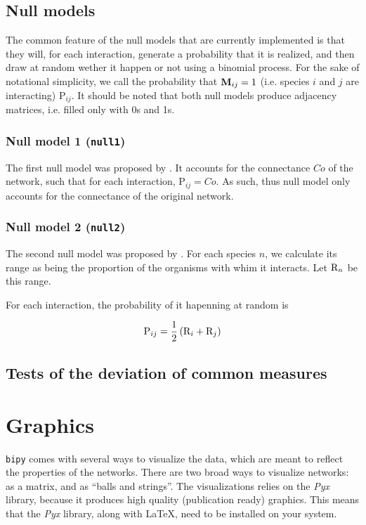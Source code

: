 \documentclass[10pt]{scrbook}
\begin{document}
\section{Null models}

The common feature of the null models that are currently implemented is that they will, for each interaction, generate a probability that it is realized, and then draw at random wether it happen or not using a binomial process. For the sake of notational simplicity, we call the probability that $\mathbf{M}\sb{ij}=1$ (i.e. species $i$ and $j$ are interacting) $\mathrm{P}_{ij}$. It should be noted that both null models produce adjacency matrices, i.e. filled only with 0s and 1s.

\subsection{Null model 1 (\texttt{null1})}

The first null model was proposed by \citet{Fortuna2006}. It accounts for the connectance $Co$ of the network, such that for each interaction, $\mathrm{P}_{ij} = Co$. As such, thus null model only accounts for the connectance of the original network.

\subsection{Null model 2 (\texttt{null2})}

The second null model was proposed by \citet{Bascompte2003}. For each species $n$, we calculate its range as being the proportion of the organisms with whim it interacts. Let $\mathrm{R}\sb{n}$ be this range.

For each interaction, the probability of it hapenning at random is

\begin{equation}
	\mathrm{P}\sb{ij} = \frac{1}{2}\left(\mathrm{R}\sb{i}+\mathrm{R}\sb{j}\right)
\end{equation}


\section{Tests of the deviation of common measures}

\chapter{Graphics}

\texttt{bipy} comes with several ways to visualize the data, which are meant to reflect the properties of the networks. There are two broad ways to visualize networks: as a matrix, and as ``balls and strings''. The visualizations relies on the \emph{Pyx} library, because it produces high quality (publication ready) graphics. This means that the \emph{Pyx} library, along with \LaTeX, need to be installed on your system.
\end{document}
